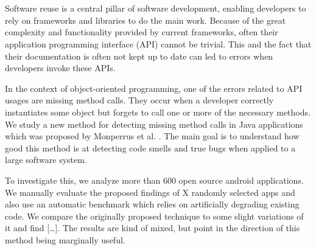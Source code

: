 \chapter{\abstractname}

Software reuse is a central pillar of software development, enabling developers to rely on frameworks and libraries to do the main work.
Because of the great complexity and functionality provided by current frameworks, often their application programming interface (API) cannot be trivial.
This and the fact that their documentation is often not kept up to date can led to errors when developers invoke these APIs. 

In the context of object-oriented programming, one of the errors related to API usages are missing method calls.
They occur when a developer correctly instantiates some object but forgets to call one or more of the necessary methods.
We study a new method for detecting missing method calls in Java applications which was proposed by Monperrus et al. \cite{monperrus2010detecting}.
The main goal is to understand how good this method is at detecting code smells and true bugs when applied to a large software system.

To investigate this, we analyze more than 600 open source android applications.
We manually evaluate the proposed findings of X randomly selected apps and also use an automatic benchmark which relies on artificially degrading existing code.
We compare the originally proposed technique to some slight variations of it and find [\ldots].
The results are kind of mixed, but point in the direction of this method being marginally useful.
